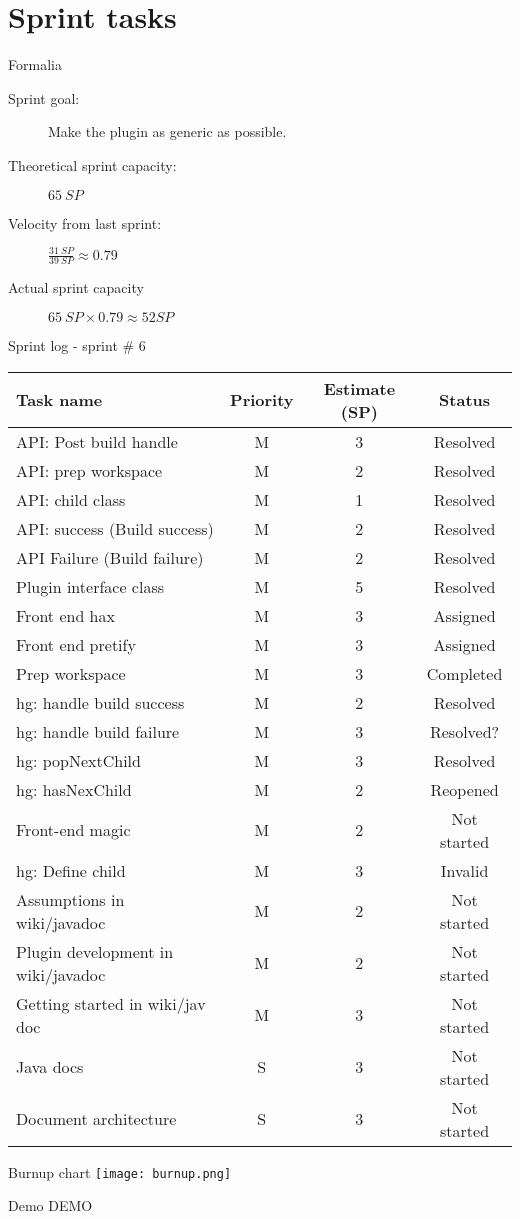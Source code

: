 \documentclass[8pt]{beamer}
\begin{document}
	\section{Sprint tasks}
		\begin{frame}{Formalia}
				\noindent
			\begin{description}
				\item[Sprint goal:] Make the plugin as generic as possible.
				\item[Theoretical sprint capacity:] $65~SP$
				\item[Velocity from last sprint:] $\frac{31~SP}{39~SP} \approx 0.79$
				\item[Actual sprint capacity] $65~SP \times 0.79 \approx  52 SP$
			\end{description}
		\end{frame}
		\begin{frame}{Sprint log - sprint \# 6}
			\begin{table}
				\center
				\begin{tabular}{|l|c|c|c|}
					\hline
					Task name & Priority & Estimate (SP) & Status \\
					\hline
					API: Post build handle & M & 3 & Resolved \\
					API: prep workspace & M & 2 & Resolved \\
					API: child class & M & 1 & Resolved \\
					API: success (Build success) & M & 2 & Resolved \\
					API Failure (Build failure) & M & 2 & Resolved \\
					Plugin interface class & M & 5 & Resolved \\
					Front end hax & M & 3 & Assigned \\
					Front end pretify & M & 3 & Assigned \\
					Prep workspace & M & 3 & Completed \\
					hg: handle build success & M & 2 & Resolved \\
					hg: handle build failure & M & 3 & Resolved? \\
					hg: popNextChild & M & 3 & Resolved \\
					hg: hasNexChild & M & 2 & Reopened \\
					Front-end magic & M & 2 & Not started \\
					hg: Define child & M & 3 & Invalid\\
					Assumptions in wiki/javadoc & M & 2 & Not started \\
					Plugin development in wiki/javadoc & M & 2 & Not started \\
					Getting started in wiki/jav doc & M & 3 & Not started \\
					Java docs & S & 3 & Not started \\
					Document architecture & S & 3 & Not started\\
					\hline
				\end{tabular}
			\end{table}
		\end{frame}
		\begin{frame}{Burnup chart}
			\texttt{[image: burnup.png]}
		\end{frame}
		\begin{frame}{Demo}
			DEMO
		\end{frame}
\end{document}
